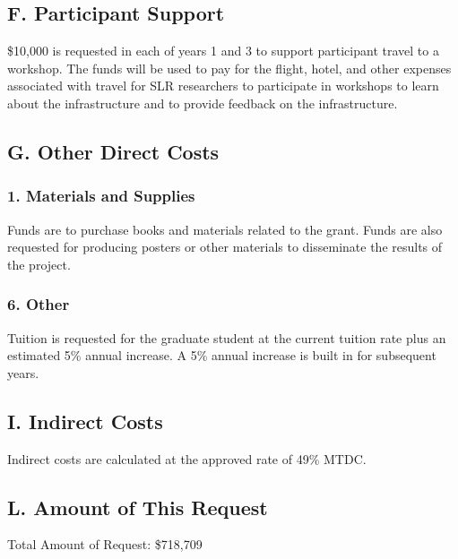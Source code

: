 \subsection*{F. Participant Support}
\noindent
\$10,000 is requested in each of years 1 and 3 to support participant travel to a workshop.
The funds will be used to pay for the flight, hotel, and other expenses associated with travel for SLR researchers to participate in workshops to learn about the infrastructure and to provide feedback on the infrastructure.
\vspace{8pt}

\subsection*{G. Other Direct Costs}
\vspace{8pt}

\subsubsection*{1. Materials and Supplies}
\noindent
Funds are to purchase books and materials related to the grant. 
Funds are also requested for producing posters or other materials to disseminate the results of the project.
\vspace{8pt}

\subsubsection*{6. Other}
\noindent
Tuition is requested for the graduate student at the current tuition rate plus an estimated 5\% annual increase. 
A 5\% annual increase is built in for subsequent years.
\vspace{8pt}\\

\subsection*{I. Indirect Costs}
\noindent
Indirect costs are calculated at the approved rate of 49\% MTDC.
\vspace{8pt}\\

\subsection*{L. Amount of This Request}
\noindent
Total Amount of Request: \$718,709